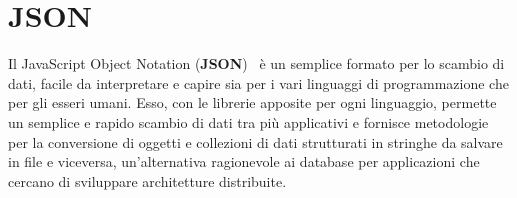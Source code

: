 \newpage

\section{JSON}
\label{sub:json}
Il JavaScript Object Notation (\textbf{JSON})~\cite{json} è un semplice formato per lo scambio di dati,
facile da interpretare e capire sia per i vari linguaggi di programmazione che per gli esseri umani.
Esso, con le librerie apposite per ogni linguaggio, permette un semplice e rapido scambio
di dati tra più applicativi e fornisce metodologie per la conversione di oggetti e collezioni
di dati strutturati in stringhe da salvare in file e viceversa, un’alternativa ragionevole ai database
per applicazioni che cercano di sviluppare architetture distribuite.
